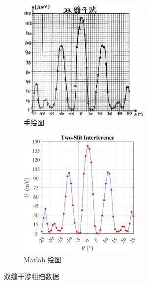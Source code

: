 \documentclass[UTF8]{article}
\theoremstyle{MyLineTheoremStyle} %
\theoremstyle{MyBlockTheoremStyle} %
\theoremstyle{MySubsubsectionStyle} %
\begin{document}
\begin{figure}[H]\centering
\begin{subfigure}[b]{0.5\columnwidth}\centering
    \includegraphics[height=170pt]{assets/2 双缝/2 双缝 粗扫.png}
    \vspace*{7mm}
    \caption{手绘图}
\end{subfigure}\hfill
\begin{subfigure}[b]{0.5\columnwidth}\centering
    \includegraphics[height=180pt]{assets/2 双缝/2 双缝 粗扫.pdf}
    \caption{Matlab 绘图}
\end{subfigure}
\caption{双缝干涉粗扫数据}
\end{figure}
\end{document}
